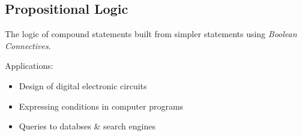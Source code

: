 \documentclass[english, 11pt]{article}
\begin{document}
\subsection{Propositional Logic}
\begin{addmargin}[1em]{2em} %
    \begin{mdframed}
    	\begin{defn}\label{Propositional Logic}
    		The logic of compound statements built from simpler statements using \textit{Boolean Connectives}.
    	\end{defn}
    \end{mdframed}
    \medskip
    Applications:
    \begin{itemize}
      \item Design of digital electronic circuits
      \item Expressing conditions in computer programs
      \item Queries to databses \& search engines
    \end{itemize}
\end{addmargin}
\end{document}

